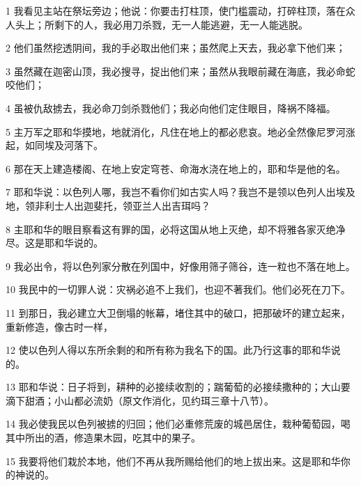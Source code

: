 \par 1 我看见主站在祭坛旁边；他说：你要击打柱顶，使门槛震动，打碎柱顶，落在众人头上；所剩下的人，我必用刀杀戮，无一人能逃避，无一人能逃脱。
\par 2 他们虽然挖透阴间，我的手必取出他们来；虽然爬上天去，我必拿下他们来；
\par 3 虽然藏在迦密山顶，我必搜寻，捉出他们来；虽然从我眼前藏在海底，我必命蛇咬他们；
\par 4 虽被仇敌掳去，我必命刀剑杀戮他们；我必向他们定住眼目，降祸不降福。
\par 5 主万军之耶和华摸地，地就消化，凡住在地上的都必悲哀。地必全然像尼罗河涨起，如同埃及河落下。
\par 6 那在天上建造楼阁、在地上安定穹苍、命海水浇在地上的，耶和华是他的名。
\par 7 耶和华说：以色列人哪，我岂不看你们如古实人吗？我岂不是领以色列人出埃及地，领非利士人出迦斐托，领亚兰人出吉珥吗？
\par 8 主耶和华的眼目察看这有罪的国，必将这国从地上灭绝，却不将雅各家灭绝净尽。这是耶和华说的。
\par 9 我必出令，将以色列家分散在列国中，好像用筛子筛谷，连一粒也不落在地上。
\par 10 我民中的一切罪人说：灾祸必追不上我们，也迎不著我们。他们必死在刀下。
\par 11 到那日，我必建立大卫倒塌的帐幕，堵住其中的破口，把那破坏的建立起来，重新修造，像古时一样，
\par 12 使以色列人得以东所余剩的和所有称为我名下的国。此乃行这事的耶和华说的。
\par 13 耶和华说：日子将到，耕种的必接续收割的；踹葡萄的必接续撒种的；大山要滴下甜酒；小山都必流奶（原文作消化，见约珥三章十八节）。
\par 14 我必使我民以色列被掳的归回；他们必重修荒废的城邑居住，栽种葡萄园，喝其中所出的酒，修造果木园，吃其中的果子。
\par 15 我要将他们栽於本地，他们不再从我所赐给他们的地上拔出来。这是耶和华你的神说的。


